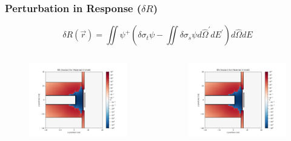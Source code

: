\documentclass[t]{beamer}
\begin{document}
\begin{frame}
  \frametitle{Perturbation in Response ($\delta R$)}
  \vskip-0.25in
  \begin{equation}
    \delta R\left(\vec{r}\right) = \iint\psi^+\left(\delta\sigma_t\psi - \iint\delta\sigma_s\psi d\hat{\Omega}^\prime dE^\prime\right)d\hat{\Omega}dE
  \end{equation}
  \vskip-0.25in
  \begin{columns}
    \begin{figure}
      \includegraphics[trim={0.7in 0.15in 1.05in 0.4in},clip,scale=0.36]{images/dR_scalar_00.png}
    \end{figure}
    \begin{figure}
      \includegraphics[trim={0.7in 0.15in 1.05in 0.4in},clip,scale=0.36]{images/dR_scalar_00.png}
    \end{figure}
  \end{columns}
\end{frame}

\end{document}
